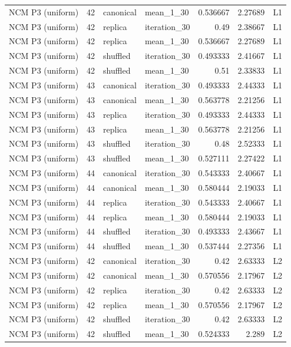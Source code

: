 \begin{table}[htbp!]
\begin{tabular}{lrllrrl}
NCM P3 (uniform) & 42 & canonical & mean\_1\_30 & 0.536667 & 2.27689 & L1 \\
NCM P3 (uniform) & 42 & replica & iteration\_30 & 0.49 & 2.38667 & L1 \\
NCM P3 (uniform) & 42 & replica & mean\_1\_30 & 0.536667 & 2.27689 & L1 \\
NCM P3 (uniform) & 42 & shuffled & iteration\_30 & 0.493333 & 2.41667 & L1 \\
NCM P3 (uniform) & 42 & shuffled & mean\_1\_30 & 0.51 & 2.33833 & L1 \\
NCM P3 (uniform) & 43 & canonical & iteration\_30 & 0.493333 & 2.44333 & L1 \\
NCM P3 (uniform) & 43 & canonical & mean\_1\_30 & 0.563778 & 2.21256 & L1 \\
NCM P3 (uniform) & 43 & replica & iteration\_30 & 0.493333 & 2.44333 & L1 \\
NCM P3 (uniform) & 43 & replica & mean\_1\_30 & 0.563778 & 2.21256 & L1 \\
NCM P3 (uniform) & 43 & shuffled & iteration\_30 & 0.48 & 2.52333 & L1 \\
NCM P3 (uniform) & 43 & shuffled & mean\_1\_30 & 0.527111 & 2.27422 & L1 \\
NCM P3 (uniform) & 44 & canonical & iteration\_30 & 0.543333 & 2.40667 & L1 \\
NCM P3 (uniform) & 44 & canonical & mean\_1\_30 & 0.580444 & 2.19033 & L1 \\
NCM P3 (uniform) & 44 & replica & iteration\_30 & 0.543333 & 2.40667 & L1 \\
NCM P3 (uniform) & 44 & replica & mean\_1\_30 & 0.580444 & 2.19033 & L1 \\
NCM P3 (uniform) & 44 & shuffled & iteration\_30 & 0.493333 & 2.43667 & L1 \\
NCM P3 (uniform) & 44 & shuffled & mean\_1\_30 & 0.537444 & 2.27356 & L1 \\
NCM P3 (uniform) & 42 & canonical & iteration\_30 & 0.42 & 2.63333 & L2 \\
NCM P3 (uniform) & 42 & canonical & mean\_1\_30 & 0.570556 & 2.17967 & L2 \\
NCM P3 (uniform) & 42 & replica & iteration\_30 & 0.42 & 2.63333 & L2 \\
NCM P3 (uniform) & 42 & replica & mean\_1\_30 & 0.570556 & 2.17967 & L2 \\
NCM P3 (uniform) & 42 & shuffled & iteration\_30 & 0.42 & 2.63333 & L2 \\
NCM P3 (uniform) & 42 & shuffled & mean\_1\_30 & 0.524333 & 2.289 & L2 \\

\end{tabular}
\end{table}
